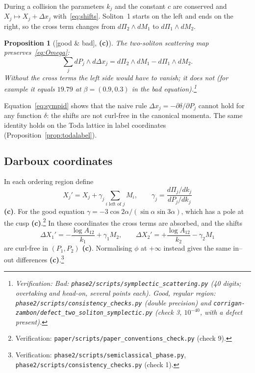 \documentclass[11pt,a4paper]{article}
\newcommand{\lab}[1]{{\normalfont\sffamily\footnotesize\bfseries(#1)}}
\newcommand{\Lc}{\lab{c}}
\newcommand{\eqtag}[2]{{\normalfont\sffamily\footnotesize\textcolor{#1}{[#2]}}}
\newcommand{\Both}{\eqtag{violet!70!black}{good \& bad}}
\newcommand{\scr}[1]{\nolinkurl{#1}}
\newcommand{\chk}[1]{\footnote{\raggedright Verification: #1.}}
\newtheorem{proposition}{Proposition}[section]
\theoremstyle{remark}
\begin{document}
During a collision the parameters $k_j$ and the constant $c$ are conserved and $X_j\mapsto X_j+\Delta x_j$ with~\eqref{eq:shifts}. Soliton~1 starts on the left and ends on the right, so the cross term changes from $d\Pi_2\wedge dM_1$ to $d\Pi_1\wedge dM_2$.

\begin{proposition}[\Both, \Lc]\label{prop:symp}
The two-soliton scattering map preserves~\eqref{eq:Omega}:
\begin{equation}\label{eq:sympid}
\sum_jdP_j\wedge d\Delta x_j=d\Pi_2\wedge dM_1-d\Pi_1\wedge dM_2 .
\end{equation}
Without the cross terms the left side would have to vanish; it does not (for example it equals $19.79$ at $\beta=(0.9,0.3)$ in the bad equation).\chk{Bad: \scr{phase2/scripts/symplectic_scattering.py} (40 digits; overtaking and head-on, several points each). Good, regular region: \scr{phase2/scripts/consistency_checks.py} (double precision) and \scr{corrigan-zambon/defect_two_soliton_symplectic.py} (check 3, $10^{-40}$, with a defect present)}
\end{proposition}

Equation~\eqref{eq:sympid} shows that the naive rule $\Delta x_j=-\partial\delta/\partial P_j$ cannot hold for any function $\delta$: the shifts are not curl-free in the canonical momenta. The same identity holds on the Toda lattice in label coordinates (Proposition~\ref{prop:todalabel}).

\subsection{Darboux coordinates}

In each ordering region define
\begin{equation}\label{eq:darboux}
X_j'=X_j+\gamma_j\sum_{i\text{ left of }j}M_i,\qquad \gamma_j=\frac{d\Pi_j/dk_j}{dP_j/dk_j}
\end{equation}
\Lc. For the good equation $\gamma=-3\cos2\alpha/(\sin\alpha\sin3\alpha)$, which has a pole at the cusp \Lc.\chk{\scr{paper/scripts/paper_conventions_check.py} (check 9)} In these coordinates the cross terms are absorbed, and the shifts
\begin{equation}\label{eq:darbouxshifts}
\Delta X_1'=-\frac{\log A_{12}}{k_1}+\gamma_1M_2,\qquad \Delta X_2'=+\frac{\log A_{12}}{k_2}-\gamma_2M_1
\end{equation}
are curl-free in $(P_1,P_2)$ \Lc. Normalising $\phi$ at $+\infty$ instead gives the same in--out differences \Lc.\chk{\scr{phase2/scripts/semiclassical_phase.py}, \scr{phase2/scripts/consistency_checks.py} (check 1)}
\end{document}
